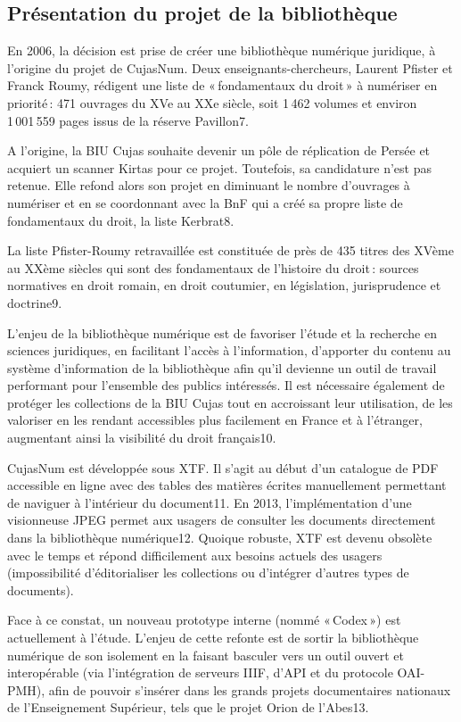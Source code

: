 \subsection*{Présentation du projet de la bibliothèque} 

En 2006, la décision est prise de créer une bibliothèque numérique juridique, à l’origine du projet de CujasNum. Deux enseignants-chercheurs, Laurent Pfister et Franck Roumy, rédigent une liste de « fondamentaux du droit » à numériser en priorité : 471 ouvrages du XVe au XXe siècle, soit 1 462 volumes et environ 1 001 559 pages issus de la réserve Pavillon7. 

A l’origine, la BIU Cujas souhaite devenir un pôle de réplication de Persée et acquiert un scanner Kirtas pour ce projet. Toutefois, sa candidature n’est pas retenue. Elle refond alors son projet en diminuant le nombre d’ouvrages à numériser et en se coordonnant avec la BnF qui a créé sa propre liste de fondamentaux du droit, la liste Kerbrat8.  

La liste Pfister-Roumy retravaillée est constituée de près de 435 titres des XVème au XXème siècles qui sont des fondamentaux de l’histoire du droit : sources normatives en droit romain, en droit coutumier, en législation, jurisprudence et doctrine9. 

L’enjeu de la bibliothèque numérique est de favoriser l’étude et la recherche en sciences juridiques, en facilitant l’accès à l’information, d’apporter du contenu au système d’information de la bibliothèque afin qu’il devienne un outil de travail performant pour l’ensemble des publics intéressés. Il est nécessaire également de protéger les collections de la BIU Cujas tout en accroissant leur utilisation, de les valoriser en les rendant accessibles plus facilement en France et à l’étranger, augmentant ainsi la visibilité du droit français10. 

CujasNum est développée sous XTF. Il s’agit au début d’un catalogue de PDF accessible en ligne avec des tables des matières écrites manuellement permettant de naviguer à l’intérieur du document11. En 2013, l’implémentation d’une visionneuse JPEG permet aux usagers de consulter les documents directement dans la bibliothèque numérique12. Quoique robuste, XTF est devenu obsolète avec le temps et répond difficilement aux besoins actuels des usagers (impossibilité d'éditorialiser les collections ou d'intégrer d’autres types de documents).  

Face à ce constat, un nouveau prototype interne (nommé « Codex ») est actuellement à l’étude. L’enjeu de cette refonte est de sortir la bibliothèque numérique de son isolement en la faisant basculer vers un outil ouvert et interopérable (via l’intégration de serveurs IIIF, d’API et du protocole OAI-PMH), afin de pouvoir s’insérer dans les grands projets documentaires nationaux de l’Enseignement Supérieur, tels que le projet Orion de l’Abes13. 

